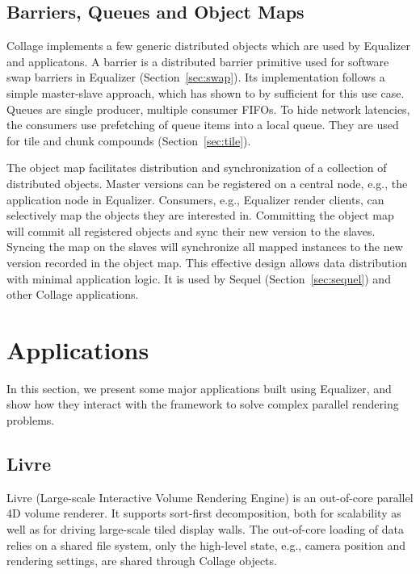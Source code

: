 \documentclass[10pt,journal,compsoc]{IEEEtran}
\newcommand{\sref}[1]{Section~\ref{#1}}
\begin{document}
\subsection{Barriers, Queues and Object Maps}\label{sec:barrier}

Collage implements a few generic distributed objects which are used by Equalizer
and applicatons. A barrier is a distributed barrier primitive used for software
swap barriers in Equalizer (\sref{sec:swap}). Its implementation follows a
simple master-slave approach, which has shown to by sufficient for this use
case. Queues are single producer, multiple consumer FIFOs. To hide network
latencies, the consumers use prefetching of queue items into a local queue. They
are used for tile and chunk compounds (\sref{sec:tile}).

The object map facilitates distribution and synchronization of a collection of
distributed objects. Master versions can be registered on a central node, e.g.,
the application node in Equalizer. Consumers, e.g., Equalizer render clients,
can selectively map the objects they are interested in. Committing the object
map will commit all registered objects and sync their new version to the
slaves. Syncing the map on the slaves will synchronize all mapped instances to
the new version recorded in the object map. This effective design allows data
distribution with minimal application logic. It is used by Sequel
(\sref{sec:sequel}) and other Collage applications.

\section{Applications}

In this section, we present some major applications built using Equalizer, and
show how they interact with the framework to solve complex parallel rendering
problems.

\subsection{Livre}

Livre (Large-scale Interactive Volume Rendering Engine) is an out-of-core
parallel 4D volume renderer. It supports sort-first decomposition, both for
scalability as well as for driving large-scale tiled display walls. The
out-of-core loading of data relies on a shared file system, only the high-level
state, e.g., camera position and rendering settings, are shared through Collage
objects.
\end{document}
